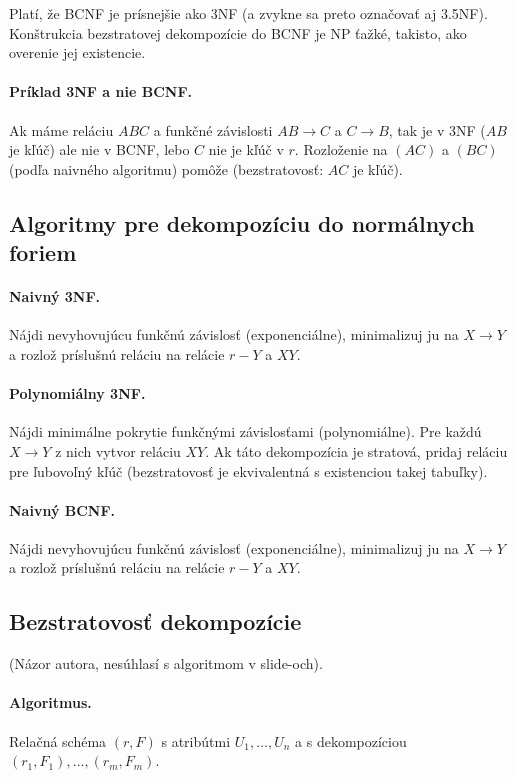 \documentclass[10pt,a4paper]{article}
\begin{document}
Platí, že BCNF je prísnejšie ako 3NF (a zvykne sa preto označovať aj 3.5NF). 
Konštrukcia bezstratovej dekompozície do BCNF je NP ťažké, takisto, ako overenie jej existencie. 

\paragraph{Príklad 3NF a nie BCNF.}
Ak máme reláciu $ABC$ a funkčné závislosti $AB \rightarrow C$ a $C \rightarrow B$,
tak je v 3NF ($AB$ je kľúč) ale nie v BCNF, lebo $C$ nie je kľúč v $r$. Rozloženie na $(AC)$ a $(BC)$ (podľa naivného algoritmu) pomôže (bezstratovosť: $AC$ je kľúč). 

\subsection{Algoritmy pre dekompozíciu do normálnych foriem}

\paragraph{Naivný 3NF.} Nájdi nevyhovujúcu funkčnú závislosť (exponenciálne), minimalizuj ju na $X \rightarrow Y$ a rozlož príslušnú reláciu na relácie $r-Y$ a $XY$. 

\paragraph{Polynomiálny 3NF.} Nájdi minimálne pokrytie funkčnými závislosťami (polynomiálne). Pre každú $X \rightarrow Y$ z nich vytvor reláciu $XY$. Ak táto dekompozícia je stratová, pridaj reláciu pre ľubovoľný kľúč (bezstratovosť je ekvivalentná s existenciou takej tabuľky).

\paragraph{Naivný BCNF.} Nájdi nevyhovujúcu funkčnú závislosť (exponenciálne), minimalizuj ju na $X \rightarrow Y$ a rozlož príslušnú reláciu na relácie $r-Y$ a $XY$. 

\subsection{Bezstratovosť dekompozície}
(Názor autora, nesúhlasí s algoritmom v slide-och). 

\paragraph{Algoritmus.}
Relačná schéma $(r,F)$ s atribútmi $U_1,\ldots,U_n$ a s dekompozíciou $(r_1, F_1),\ldots,(r_m, F_m)$.
\end{document}
